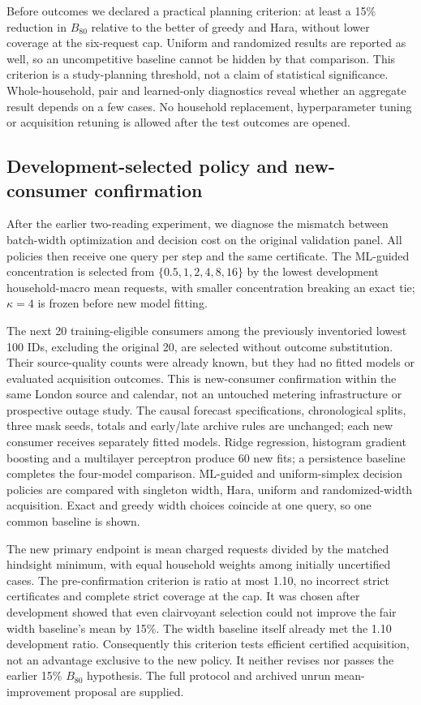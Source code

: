 \documentclass[12pt]{article}
\begin{document}
Before outcomes we declared a practical planning criterion: at least a
15\% reduction in $B_{80}$ relative to the better of greedy and Hara, without
lower coverage at the six-request cap. Uniform and randomized results are
reported as well, so an uncompetitive baseline cannot be hidden by that
comparison. This criterion is a study-planning threshold, not a claim of
statistical significance. Whole-household,
pair and learned-only diagnostics reveal whether an aggregate result depends
on a few cases. No household replacement, hyperparameter tuning or acquisition
retuning is allowed after the test outcomes are opened.

\subsection{Development-selected policy and new-consumer confirmation}\label{sec:decision-confirmation-design}
After the earlier two-reading experiment, we diagnose the mismatch between
batch-width optimization and decision cost on the original validation panel.
All policies then receive one query per step and the same certificate.
The ML-guided concentration is selected from $\{0.5,1,2,4,8,16\}$ by the
lowest development household-macro mean requests, with smaller concentration
breaking an exact tie; $\kappa=4$ is frozen before new model fitting.

The next 20 training-eligible consumers among the previously inventoried
lowest 100 IDs, excluding the original 20, are selected without outcome
substitution. Their source-quality counts were already known, but they had
no fitted models or evaluated acquisition outcomes. This is new-consumer
confirmation within the same London source and calendar, not an untouched
metering infrastructure or prospective outage study. The causal forecast
specifications, chronological splits, three mask seeds, totals and early/late
archive rules are unchanged; each new consumer receives separately fitted
models. Ridge regression, histogram gradient boosting and a multilayer
perceptron produce 60 new fits; a persistence baseline completes the
four-model comparison. ML-guided and uniform-simplex decision policies are compared with
singleton width, Hara, uniform and randomized-width acquisition. Exact and
greedy width choices coincide at one query, so one common baseline is shown.

The new primary endpoint is mean charged requests divided by the matched
hindsight minimum, with equal household weights among initially uncertified
cases. The pre-confirmation criterion is ratio at most 1.10, no incorrect
strict certificates and complete strict coverage at the cap. It was chosen
after development showed that even clairvoyant selection could not improve
the fair width baseline's mean by 15\%. The width baseline itself already
met the 1.10 development ratio. Consequently this criterion tests efficient
certified acquisition, not an advantage exclusive to the new policy.
It neither revises nor passes the earlier 15\% $B_{80}$ hypothesis.
The full protocol and archived unrun mean-improvement proposal are supplied.
\end{document}
